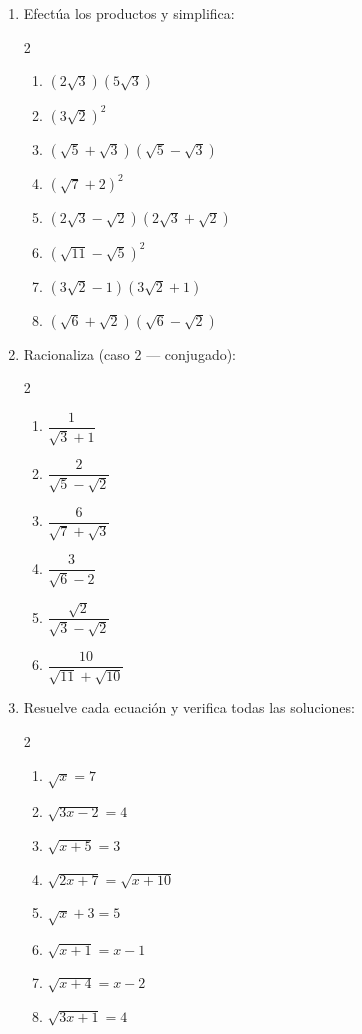 \documentclass[11pt, letterpaper]{article}
\begin{document}
\begin{enumerate}[label=\textbf{\arabic*.}, leftmargin=*, resume]
  \item Efectúa los productos y simplifica:
  \begin{multicols}{2}
  \begin{enumerate}[label=\alph*)]
    \item $(2\sqrt{3})(5\sqrt{3})$
    \item $(3\sqrt{2})^2$
    \item $(\sqrt{5}+\sqrt{3})(\sqrt{5}-\sqrt{3})$
    \item $(\sqrt{7}+2)^2$
    \item $(2\sqrt{3}-\sqrt{2})(2\sqrt{3}+\sqrt{2})$
    \item $(\sqrt{11}-\sqrt{5})^2$
    \item $(3\sqrt{2}-1)(3\sqrt{2}+1)$
    \item $(\sqrt{6}+\sqrt{2})(\sqrt{6}-\sqrt{2})$
  \end{enumerate}
  \end{multicols}

  \item Racionaliza (caso 2 — conjugado):
  \begin{multicols}{2}
  \begin{enumerate}[label=\alph*)]
    \item $\dfrac{1}{\sqrt{3}+1}$
    \item $\dfrac{2}{\sqrt{5}-\sqrt{2}}$
    \item $\dfrac{6}{\sqrt{7}+\sqrt{3}}$
    \item $\dfrac{3}{\sqrt{6}-2}$
    \item $\dfrac{\sqrt{2}}{\sqrt{3}-\sqrt{2}}$
    \item $\dfrac{10}{\sqrt{11}+\sqrt{10}}$
  \end{enumerate}
  \end{multicols}

  \item Resuelve cada ecuación y verifica todas las soluciones:
  \begin{multicols}{2}
  \begin{enumerate}[label=\alph*)]
    \item $\sqrt{x} = 7$
    \item $\sqrt{3x-2} = 4$
    \item $\sqrt{x+5} = 3$
    \item $\sqrt{2x+7} = \sqrt{x+10}$
    \item $\sqrt{x}+3=5$
    \item $\sqrt{x+1}=x-1$
    \item $\sqrt{x+4}=x-2$
    \item $\sqrt{3x+1} = 4$
  \end{enumerate}
  \end{multicols}
\end{enumerate}
\end{document}
